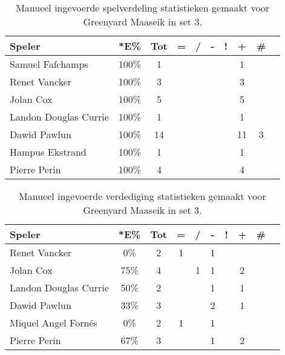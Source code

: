 \begin{table}[ht!]
    \centering
    \scriptsize
    \begin{tabular}{|l|c|c|c|c|c|c|c|c|c|}
        \hline
        \textbf{Speler} & *E\% & Tot & = & / & - & ! & + & \# \\ \hline
        Samuel Fafchamps  & 100\% & 1 &  &  &  &  & 1 &  \\ 
        Renet Vancker & 100\% & 3 &  &  &  &  & 3 &  \\
        Jolan Cox & 100\% & 5 &  &  &  &  & 5 &  \\ 
        Landon Douglas Currie & 100\% & 1 &  &  &  &  & 1 &  \\ 
        Dawid Pawlun & 100\% & 14 &  &  &  &  & 11 & 3 \\ 
        Hampus Ekstrand & 100\% & 1 &  &  &  &  & 1 &  \\
        Pierre Perin & 100\% & 4 &  &  &  &  & 4 &  \\ \hline
    \end{tabular}
    \caption[Manueel ingevoerde spelverdelingsstatistieken gemaakt voor Greenyard Maaseik in set 3]{\label{tab:PL1SetMaaseikMan3}Manueel ingevoerde spelverdeling statistieken gemaakt voor Greenyard Maaseik in set 3.}
\end{table}

\begin{table}[ht!]
    \centering
    \scriptsize
    \begin{tabular}{|l|c|c|c|c|c|c|c|c|c|}
        \hline
        \textbf{Speler} & *E\% & Tot & = & / & - & ! & + & \#\\ \hline
        Renet Vancker & 0\% & 2 & 1 &  & 1 &  &  &  \\ 
        Jolan Cox & 75\% & 4 &  & 1 & 1 &  & 2 &  \\ 
        Landon Douglas Currie & 50\% & 2 &  &  & 1 &  & 1 &  \\ 
        Dawid Pawlun & 33\% & 3 &  &  & 2 &  & 1 &  \\ 
        Miquel Angel Fornés & 0\% & 2 & 1 &  & 1 &  &  &  \\ 
        Pierre Perin & 67\% & 3 &  &  & 1 &  & 2 &  \\ \hline
    \end{tabular}
    \caption[Manueel ingevoerde verdedigingsstatistieken gemaakt voor Greenyard Maaseik in set 3]{\label{tab:PL1DigMaaseikMan3}Manueel ingevoerde verdediging statistieken gemaakt voor Greenyard Maaseik in set 3.}
\end{table}

